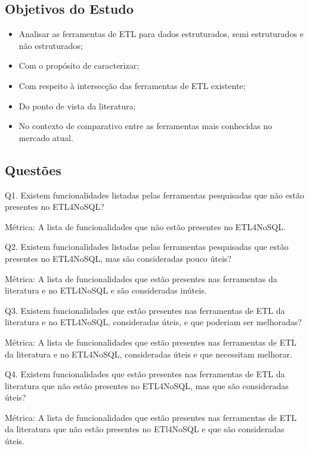 \subsection{Objetivos do Estudo}

\begin{itemize}
	\item Analisar as ferramentas de ETL para dados estruturados, semi estruturados e não estruturados;
	
	\item Com o propósito de caracterizar;
	
	\item Com respeito à intersecção das ferramentas de ETL existente;
	
	\item Do ponto de vista da literatura;
	
	\item No contexto de comparativo entre as ferramentas mais conhecidas no mercado atual.
\end{itemize}


\subsection{Questões}

Q1. Existem funcionalidades listadas pelas ferramentas pesquisadas que não estão presentes no ETL4NoSQL?

Métrica: A lista de funcionalidades que não estão presentes no ETL4NoSQL.

Q2. Existem funcionalidades listadas pelas ferramentas pesquisadas que estão presentes no ETL4NoSQL, mas são consideradas pouco úteis?

Métrica: A lista de funcionalidades que estão presentes nas ferramentas da literatura e no ETL4NoSQL e são consideradas inúteis.

Q3. Existem funcionalidades que estão presentes nas ferramentas de ETL da literatura e no ETL4NoSQL, consideradas úteis, e que poderiam ser melhoradas?

Métrica: A lista de funcionalidades que estão presentes nas ferramentas de ETL da literatura e no ETL4NoSQL, consideradas úteis e que necessitam melhorar.

Q4. Existem funcionalidades que estão presentes nas ferramentas de ETL da literatura que não estão presentes no ETL4NoSQL, mas que são consideradas úteis?

Métrica: A lista de funcionalidades que estão presentes nas ferramentas de ETL da literatura que não estão presentes no ETl4NoSQL e que são consideradas úteis.

